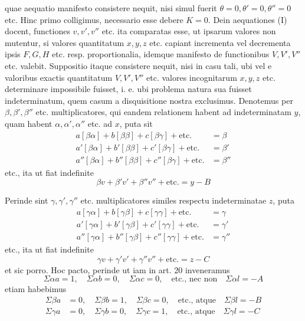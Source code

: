 quae aequatio manifesto consistere nequit, nisi simul fuerit \(\theta=0,\allowbreak\theta'=0,\allowbreak\theta''=0\) etc. Hinc primo colligimus, necessario esse debere \(K=0\). Dein aequationes (I) docent, functiones \(v,v',v''\) etc. ita comparatas esse, ut ipsarum valores non mutentur, si valores quantitatum \(x,y,z\) etc. capiant incrementa vel decrementa ipsis \(F,G,H\) etc. resp. proportionalia, idemque manifesto de functionibus \(V,V',V''\) etc. valebit. Suppositio itaque consistere nequit, nisi in casu tali, ubi vel e valoribus exactis quantitatum \(V,V',V''\) etc. valores incognitarum \(x,y,z\) etc. determinare impossibile fuisset, i. e. ubi problema natura sua fuisset indeterminatum, quem casum a disquisitione nostra exclusimus.
Denotemus per \(\beta,\beta',\beta''\) etc. multiplicatores, qui eandem relationem habent ad indeterminatam \(y\), quam habent \(\alpha,\alpha',\alpha''\) etc. ad \(x\), puta sit
\[
\begin{aligned}
a[\beta\alpha]+b[\beta\beta]+c[\beta\gamma]+\text{etc.}&=\beta\\
a'[\beta\alpha]+b'[\beta\beta]+c'[\beta\gamma]+\text{etc.}&=\beta'\\
a''[\beta\alpha]+b''[\beta\beta]+c''[\beta\gamma]+\text{etc.}&=\beta''
\end{aligned}
\]
etc., ita ut fiat indefinite
\[
\beta v+\beta'v'+\beta''v''+\text{etc.}=y-B
\]
\par{}
Perinde sint \(\gamma,\gamma',\gamma''\) etc. multiplicatores similes respectu indeterminatae \(z\), puta
\[
\begin{aligned}
a[\gamma\alpha]+b[\gamma\beta]+c[\gamma\gamma]+\text{etc.}&=\gamma\\
a'[\gamma\alpha]+b'[\gamma\beta]+c'[\gamma\gamma]+\text{etc.}&=\gamma'\\
a''[\gamma\alpha]+b''[\gamma\beta]+c''[\gamma\gamma]+\text{etc.}&=\gamma''
\end{aligned}
\]
etc., ita ut fiat indefinite
\[
\gamma v+\gamma'v'+\gamma''v''+\text{etc.}=z-C
\]
et sic porro. Hoc pacto, perinde ut iam in art. 20 inveneramus
\[
\Sigma\alpha a=1,\quad\Sigma\alpha b=0,\quad\Sigma\alpha c=0,\quad\text{etc., nec non}\quad\Sigma\alpha l=-A
\]
etiam habebimus
\[
\begin{aligned}
\Sigma\beta a&=0,\quad\Sigma\beta b=1,\quad\Sigma\beta c=0,\quad\text{etc., atque}\quad\Sigma\beta l=-B\\
\Sigma\gamma a&=0,\quad\Sigma\gamma b=0,\quad\Sigma\gamma c=1,\quad\text{etc., atque}\quad\Sigma\gamma l=-C
\end{aligned}
\]
